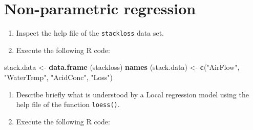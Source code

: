 \documentclass[
]{book}
\newenvironment{Shaded}{\begin{snugshade}}{\end{snugshade}}
\newcommand{\FunctionTok}[1]{\textcolor[rgb]{0.13,0.29,0.53}{\textbf{#1}}}
\newcommand{\NormalTok}[1]{#1}
\newcommand{\OtherTok}[1]{\textcolor[rgb]{0.56,0.35,0.01}{#1}}
\newcommand{\StringTok}[1]{\textcolor[rgb]{0.31,0.60,0.02}{#1}}
\begin{document}
\section{Non-parametric regression}\label{non-parametric-regression}

\begin{enumerate}
\def\labelenumi{(\alph{enumi})}
\item
  Inspect the help file of the \texttt{stackloss} data set.
\item
  Execute the following R code:
\end{enumerate}

\begin{Shaded}
\begin{Highlighting}[]
\NormalTok{stack.data }\OtherTok{\textless{}{-}} \FunctionTok{data.frame}\NormalTok{ (stackloss)}
\FunctionTok{names}\NormalTok{ (stack.data) }\OtherTok{\textless{}{-}} \FunctionTok{c}\NormalTok{(}\StringTok{"AirFlow"}\NormalTok{, }\StringTok{"WaterTemp"}\NormalTok{, }\StringTok{"AcidConc"}\NormalTok{, }\StringTok{"Loss"}\NormalTok{)}
\end{Highlighting}
\end{Shaded}

\begin{enumerate}
\def\labelenumi{(\alph{enumi})}
\setcounter{enumi}{2}
\item
  Describe briefly what is understood by a Local regression model using the help file of the function \texttt{loess()}.
\item
  Execute the following R code:
\end{enumerate}
\end{document}
